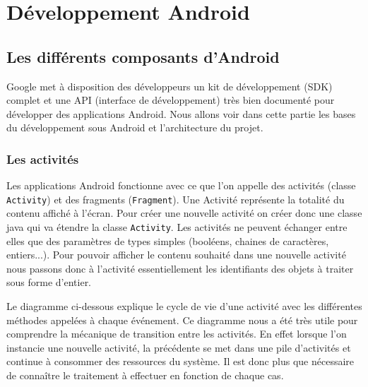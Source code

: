 \chapter{Développement Android}
\section{Les différents composants d'Android}
Google met à disposition des développeurs un kit de développement (SDK) complet et une API (interface de développement) très bien documenté pour développer des applications Android. Nous allons voir dans cette partie les bases du développement sous Android et l'architecture du projet.
\subsection{Les activités}
Les applications Android fonctionne avec ce que l'on appelle des activités (classe \verb!Activity!) et des fragments (\verb!Fragment!).
Une Activité représente la totalité du contenu affiché à l'écran. Pour créer une nouvelle activité on créer donc une classe java qui va étendre la classe \verb!Activity!. Les activités ne peuvent échanger entre elles que des paramètres de types simples (booléens, chaines de caractères, entiers...). Pour pouvoir afficher le contenu souhaité dans une nouvelle activité nous passons donc à l'activité essentiellement les identifiants des objets à traiter sous forme d'entier.\bigskip

Le diagramme ci-dessous explique le cycle de vie d'une activité avec les différentes méthodes appelées à chaque événement. Ce diagramme nous a été très utile pour comprendre la mécanique de transition entre les activités. En effet lorsque l'on instancie une nouvelle activité, la précédente se met dans une pile d'activités et continue à consommer des ressources du système. Il est donc plus que nécessaire de connaître le traitement à effectuer en fonction de chaque cas.

